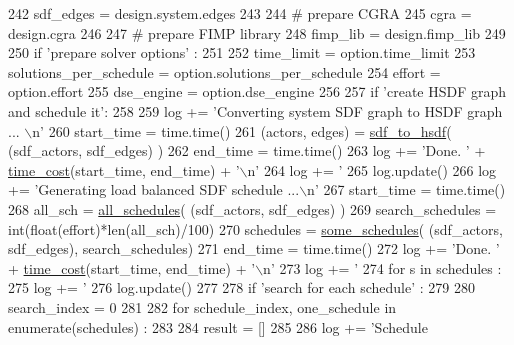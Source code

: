 \begin{DoxyCode}
{{{{{{{{242     sdf\_edges = design.system.edges
243 
244   \textcolor{comment}{# prepare CGRA}
245   cgra = design.cgra
246 
247   \textcolor{comment}{# prepare FIMP library}
248   fimp\_lib = design.fimp\_lib
249 
250   \textcolor{keywordflow}{if} \textcolor{stringliteral}{'prepare solver options'} :
251 
252     time\_limit = option.time\_limit
253     solutions\_per\_schedule = option.solutions\_per\_schedule
254     effort = option.effort
255     dse\_engine = option.dse\_engine
256 
257   \textcolor{keywordflow}{if} \textcolor{stringliteral}{'create HSDF graph and schedule it'}:
258 
259     log += \textcolor{stringliteral}{'Converting system SDF graph to HSDF graph ... \(\backslash\)n'}
260     start\_time = time.time()
261     (actors, edges) = \hyperlink{namespacesylva_1_1base_1_1sdf__to__hsdf_a41dda1a461cf7b083fbd682fc94d5e10}{sdf\_to\_hsdf}( (sdf\_actors, sdf\_edges) )
262     end\_time = time.time()
263     log += \textcolor{stringliteral}{'Done. '} + \hyperlink{namespacesylva_1_1dse_1_1dse_acf83688e18cc0859483b4c9bb70183fd}{time\_cost}(start\_time, end\_time) + \textcolor{stringliteral}{'\(\backslash\)n'}
264     log += \textcolor{stringliteral}{'%
265     log.update()
266     log += \textcolor{stringliteral}{'Generating load balanced SDF schedule ...\(\backslash\)n'}
267     start\_time = time.time()
268     all\_sch = \hyperlink{namespacesylva_1_1dse_1_1dse__engine__v1_a8ca06c203c74d5cd06866a67203d251c}{all\_schedules}( (sdf\_actors, sdf\_edges) )
269     search\_schedules = int(float(effort)*len(all\_sch)/100)
270     schedules = \hyperlink{namespacesylva_1_1dse_1_1dse__engine__v1_a4a316401cfa961e555596115afe86b4c}{some\_schedules}( (sdf\_actors, sdf\_edges), search\_schedules)
271     end\_time = time.time()
272     log += \textcolor{stringliteral}{'Done. '} + \hyperlink{namespacesylva_1_1dse_1_1dse_acf83688e18cc0859483b4c9bb70183fd}{time\_cost}(start\_time, end\_time) + \textcolor{stringliteral}{'\(\backslash\)n'}
273     log += \textcolor{stringliteral}{'%
274     \textcolor{keywordflow}{for} s \textcolor{keywordflow}{in} schedules :
275       log += \textcolor{stringliteral}{'%
276     log.update()
277 
278   \textcolor{keywordflow}{if} \textcolor{stringliteral}{'search for each schedule'} :
279 
280     search\_index = 0
281 
282     \textcolor{keywordflow}{for} schedule\_index, one\_schedule \textcolor{keywordflow}{in} enumerate(schedules) :
283 
284       result = []
285 
286       log += \textcolor{stringliteral}{'Schedule %
}}}}}}}}}}}}
\end{DoxyCode}
